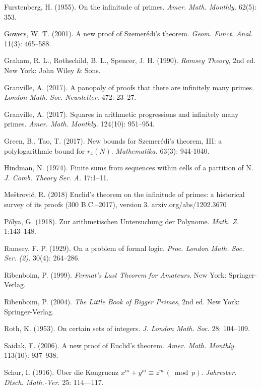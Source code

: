 \documentclass{article}
\theoremstyle{theorem}
\theoremstyle{definition}
\begin{document}
\begin{thebibliography}{99}
  Furstenberg, H. (1955). On the infinitude of primes.
\textit{Amer. Math. Monthly.} 62(5): 353.


Gowers, W. T. (2001).
A new proof of Szemer\'{e}di's theorem.
\textit{Geom. Funct. Anal.} 11(3): 465--588. 

Graham, R. L., Rothschild, B. L., Spencer, J. H. (1990).
\textit{Ramsey Theory}, 2nd ed. New York: John Wiley \& Sons.

Granville, A. (2017).
A panopoly of proofs that there are infinitely many primes.
\textit{London Math. Soc. Newsletter.} 472: 23--27.

Granville, A. (2017). 
Squares in arithmetic progressions and infinitely many primes.
\textit{Amer. Math. Monthly.} 124(10): 951--954.

Green, B., Tao, T. (2017).
New bounds for Szemer\'{e}di's theorem, III: 
a polylogarithmic bound for $r_4(N)$.
\textit{Mathematika.} 63(3): 944-1040. 

Hindman, N. (1974).
Finite sums from sequences within cells of a partition of N. 
\textit{J. Comb. Theory Ser. A.} 17:1--11.

Me\v{s}trovi\'{c}, R. (2018)
Euclid's theorem on the infinitude of primes: 
a historical survey of its proofs (300 B.C.--2017), version 3.
arxiv.org/abs/1202.3670

P\'{o}lya, G. (1918).
Zur arithmetischen Untersuchung der Polynome.
\textit{Math. Z.} 1:143--148.

Ramsey, F. P. (1929).
On a problem of formal logic.
\textit{Proc. London Math. Soc. Ser. (2).} 30(4): 264--286. 


Ribenboim, P. (1999).
\textit{Fermat's Last Theorem for Amateurs}. 
New York: Springer-Verlag.

Ribenboim, P. (2004). 
\textit{The Little Book of Bigger Primes}, 2nd ed. New York: 
Springer-Verlag.

Roth, K. (1953). On certain sets of integers.
\textit{J. London Math. Soc.} 28: 104--109.

Saidak, F. (2006). A new proof of Euclid's theorem.
\textit{Amer. Math. Monthly.} 113(10): 937--938.

Schur, I. (1916).
\"Uber die Kongruenz $x^m + y^m \equiv z^m \, (\bmod p)$.
\textit{Jahresber. Dtsch. Math.-Ver.} 25: 114---117.


\end{thebibliography}
\end{document}
